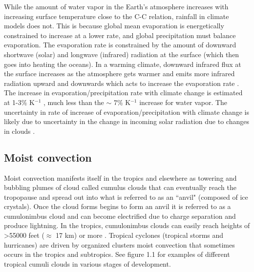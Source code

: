 \documentclass[letterpaper,12pt,titlepage,oneside,final]{book}
\begin{document}
While the amount of water vapor in the Earth's atmosphere increases with increasing surface temperature close to the C-C relation, rainfall in climate models does not. This is because global mean evaporation is energetically constrained to increase at a lower rate, and global precipitation must balance evaporation. The evaporation rate is constrained by the amount of downward shortwave (solar) and longwave (infrared) radiation at the surface (which then goes into heating the oceans). In a warming climate, downward infrared flux at the surface increases as the atmosphere gets warmer and emits more infrared radiation upward and downwards which acts to increase the evaporation rate \cite{boer_climate_1993}. The increase in evaporation/precipitation rate with climate change is estimated at 1-3$\%$ K$^{-1}$ \cite{schneider_water_2010,he_anthropogenic_2015,boer_climate_1993}, much less than the $\sim$ $7 \%$ K$^{-1}$ increase for water vapor. The uncertainty in rate of increase of evaporation/precipitation with climate change is likely due to uncertainty in the change in incoming solar radiation due to changes in clouds \cite{allen_constraints_2002}.

\subsection{Moist convection}

Moist convection manifests itself in the tropics and elsewhere as towering and bubbling plumes of cloud called cumulus clouds that can eventually reach the tropopause and spread out into what is referred to as an ``anvil" (composed of ice crystals). Once the cloud forms begins to form an anvil it is referred to as a cumulonimbus cloud and can become electrified due to charge separation and produce lightning. In the tropics, cumulonimbus clouds can easily reach heights of >55000 feet ($\approx$ 17 km) or more \cite{hollars_comparisons_2004}. Tropical cyclones (tropical storms and hurricanes) are driven by organized clusters moist convection that sometimes occurs in the tropics and subtropics. See figure 1.1 for examples of different tropical cumuli clouds in various stages of development.
\end{document}
